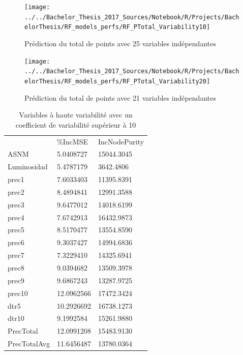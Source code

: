 \begin{figure}[H]
	\centering
	\texttt{[image: ../../Bachelor\_Thesis\_2017\_Sources/Notebook/R/Projects/BachelorThesis/RF\_models\_perfs/RF\_PTotal\_Variability10]}
	\caption{Prédiction du total de points avec 25 variables indépendantes}
	\label{fig:rfptotalvariability10}
\end{figure}
\begin{figure}[H]
	\centering
	\texttt{[image: ../../Bachelor\_Thesis\_2017\_Sources/Notebook/R/Projects/BachelorThesis/RF\_models\_perfs/RF\_PTotal\_Variability20]}
	\caption{Prédiction du total de points avec 21 variables indépendantes}
	\label{fig:rfptotalvariability20}
\end{figure}





\begin{table}[H]
	\centering
	\caption{Variables à haute variabilité avec un coefficient de variabilité supérieur à 10}
	\label{tab:variability10Variables}
	\begin{tabular}{lll}
		& \%IncMSE   & IncNodePurity \\
		ASNM           & 5.0408727  & 15044.3045    \\
		Luminosidad    & 5.4787179  & 3642.4806     \\
		prec1          & 7.6033403  & 11395.8391    \\
		prec2          & 8.4894841  & 12991.3588    \\
		prec3          & 9.6477012  & 14018.6199    \\
		prec4          & 7.6742913  & 16432.9873    \\
		prec5          & 8.5170477  & 13554.8590    \\
		prec6          & 9.3037427  & 14994.6836    \\
		prec7          & 7.3229410  & 14325.6941    \\
		prec8          & 9.0394682  & 13509.3978    \\
		prec9          & 9.6867243  & 13287.9725    \\
		prec10         & 12.0962566 & 17472.3424    \\
		dtr5           & 10.2926692 & 16738.1273    \\
		dtr10          & 9.1992584  & 15261.9880    \\
		PrecTotal      & 12.0991208 & 15483.9130    \\
		PrecTotalAvg   & 11.6456487 & 13780.0364    \\

\end{tabular}
\end{table}
